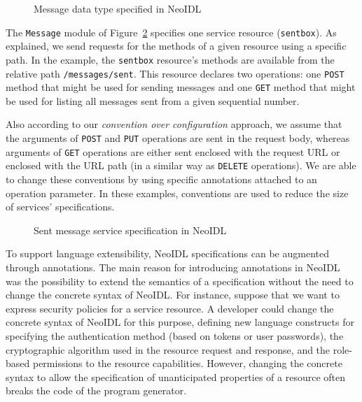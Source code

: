 \documentclass{ws-ijseke}
\newcommand{\neoidl}{NeoIDL}
\newcommand{\method}[1]{\texttt{#1}}
\begin{document}
\begin{figure}[htb]
\begin{small}

\vspace{-.5cm}
\end{small}
\caption{Message data type specified in \neoidl}
\label{lst:messagedata-neo}
\end{figure}

The \texttt{Message} module of Figure~\ref{lst:sentmessage-neo}
specifies one service resource (\texttt{sentbox}). As explained,
we send requests for the methods of a given resource using a specific
path. In the example, the \texttt{sentbox} resource's
methods are available from the relative path
\texttt{/messages/sent}. This resource declares 
 two operations: one
\method{POST} method that might be used for
sending messages and one \method{GET} method 
that might be used for listing all messages
sent from a given sequential number.

Also according to our \emph{convention over configuration}
approach, we assume
that the arguments of \method{POST} and \method{PUT} operations
are sent in the 
request body, whereas arguments of \method{GET} operations are
either sent enclosed
with the request URL or enclosed with the URL path (in a similar way
as \method{DELETE} operations). We are able to change these conventions by
using specific annotations attached to an operation parameter.  In
these examples, conventions are used to reduce the size of services'
specifications. 

\begin{figure}[htb]
\begin{small}

\end{small}
\caption{Sent message service specification in \neoidl}
\label{lst:sentmessage-neo}
\end{figure}

To support language extensibility, \neoidl{}
specifications can be augmented through annotations. The main reason
for introducing annotations in \neoidl{} was the possibility to extend
the semantics of a specification without the need to change the 
concrete syntax of \neoidl. For instance, suppose that we want to 
express security policies for a service resource. A developer could 
change the concrete syntax of \neoidl{} for this purpose, defining new
language constructs for specifying the authentication method (based on
tokens or user passwords), the cryptographic algorithm used in the
resource request and response, and the role-based permissions to the
resource capabilities. However,
changing the concrete syntax to allow the specification of
unanticipated properties of a resource often breaks the code of the program
generator. 
\end{document}
